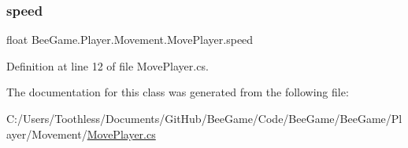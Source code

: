 \subsubsection{\texorpdfstring{speed}{speed}}
{\footnotesize\ttfamily float Bee\+Game.\+Player.\+Movement.\+Move\+Player.\+speed}



Definition at line 12 of file Move\+Player.\+cs.



The documentation for this class was generated from the following file\+:\begin{DoxyCompactItemize}
\item 
C\+:/\+Users/\+Toothless/\+Documents/\+Git\+Hub/\+Bee\+Game/\+Code/\+Bee\+Game/\+Bee\+Game/\+Player/\+Movement/\hyperlink{_move_player_8cs}{Move\+Player.\+cs}\end{DoxyCompactItemize}
